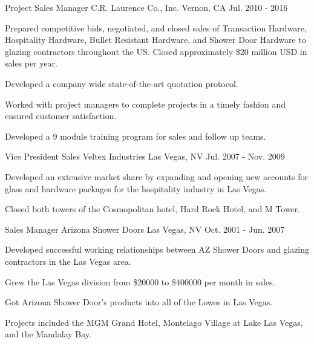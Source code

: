 \begin{cventries}
\cventry
{Project Sales Manager} %
{C.R. Laurence Co., Inc. } %
{Vernon, CA} %
{Jul. 2010 - 2016} %
{ %
\begin{cvitems}
\item {Prepared competitive bids, negotiated, and closed sales of Transaction Hardware, Hospitality Hardware, Bullet Resistant Hardware, and Shower Door Hardware to glazing contractors throughout the US. Closed approximately \$20 million USD in sales per year.}
\item {Developed a company wide state-of-the-art quotation protocol.}
\item {Worked with project managers to complete projects in a timely fashion and ensured customer satisfaction.}
\item {Developed a 9 module training program for sales and follow up teams.}
\end{cvitems}
}


\cventry
{Vice President Sales} %
{Veltex Industries} %
{Las Vegas, NV} %
{Jul. 2007 - Nov. 2009} %
{ %
\begin{cvitems}
\item {Developed an extensive market share by expanding and opening new accounts for glass and hardware packages for the hospitality industry in Las Vegas.}
\item {Closed both towers of the Cosmopolitan hotel, Hard Rock Hotel, and M Tower.}
\end{cvitems}
}


\cventry
{Sales Manager} %
{Arizona Shower Doors} %
{Las Vegas, NV} %
{Oct. 2001 - Jun. 2007} %
{ %
\begin{cvitems}
\item {Developed successful working relationships between AZ Shower Doors and glazing contractors in the Las Vegas area.}
\item {Grew the Las Vegas division from \$20000 to \$400000 per month in sales.}
\item{Got Arizona Shower Door's products into all of the Lowes in Las Vegas.}
\item{Projects included the MGM Grand Hotel, Montelago Village at Lake Las Vegas, and the Mandalay Bay.}
\end{cvitems} 
}


\end{cventries}
